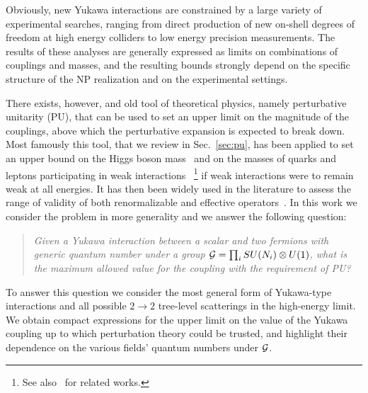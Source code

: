 \documentclass[a4paper,11pt]{article}
\begin{document}
Obviously, new Yukawa interactions are constrained by a large variety of experimental searches, ranging from direct production of new on-shell degrees of freedom at high energy colliders to low energy precision measurements. The results of these analyses are generally expressed as limits on combinations of couplings and masses, and the resulting bounds  strongly depend on the specific structure of the NP realization and on the experimental settings.

There exists, however, and old tool of theoretical physics, namely perturbative unitarity (PU), that can be used to set an upper limit on the magnitude of the couplings, above which the perturbative expansion is expected to break down. Most famously this tool, that we review in Sec.~\ref{sec:pu}, has been applied to set an upper bound on the Higgs boson mass~\cite{Lee:1977yc,Lee:1977eg,Marciano:1989ns,Horejsi:2005da} 
and on the masses of quarks and leptons participating in weak interactions
\cite{Chanowitz:1978mv,Chanowitz:1978uj}~\footnote{See also~\cite{Dicus:2004rg,Dicus:2005ku} for related works.} if weak  interactions were to remain weak at all energies. 
It has then been widely used in the literature to assess the range of validity of both renormalizable
 and effective operators~\cite{Griest:1989wd,Hally:2012pu,Kahlhoefer:2015bea,Chang:2019vez,Abu-Ajamieh:2020yqi,DiLuzio:2017tfn,DiLuzio:2016sur,Capdevilla:2021rwo,Allwicher:2021jkr,DiLuzio:2017chi,Corbett:2014ora,Corbett:2017qgl,Almeida:2020ylr,Brivio:2021fog}.  In this work we consider the problem in more generality and we answer the following question:
 \vspace{-0.085cm}
\begin{quote}
 {\emph{Given a Yukawa interaction between a scalar and two fermions with generic quantum number under a group ${\cal G}=\prod_i SU(N_i) \otimes U(1)$, what is the maximum allowed value for the coupling with the requirement of PU? }}
\end{quote}
To answer this question we  consider the most general form of Yukawa-type interactions and all possible $2\to 2$ tree-level scatterings in the high-energy limit. We obtain compact expressions for the upper limit on the value of the Yukawa coupling up to which perturbation theory could be trusted, and highlight their dependence on the various fields' quantum numbers under ${\cal G}$.
\end{document}

